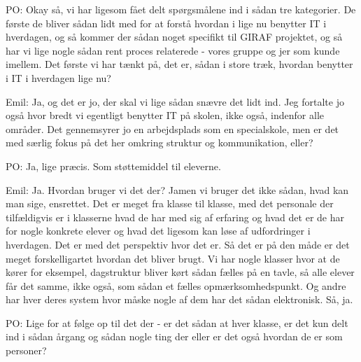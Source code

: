 PO:
Okay så, vi har ligesom fået delt spørgsmålene ind i sådan tre kategorier. 
De første de bliver sådan lidt med for at forstå hvordan i lige nu benytter IT i hverdagen, og så kommer der sådan noget specifikt til GIRAF projektet, og så har vi lige nogle sådan rent proces relaterede - vores gruppe og jer som kunde imellem.
Det første vi har tænkt på, det er, sådan i store træk, hvordan benytter i IT i hverdagen lige nu?   

Emil: 
Ja, og det er jo, der skal vi lige sådan snævre det lidt ind. 
Jeg fortalte jo også hvor bredt vi egentligt benytter IT på skolen, ikke også, indenfor alle områder. 
Det gennemsyrer jo en arbejdsplads som en specialskole, men er det med særlig fokus på det her omkring struktur og kommunikation, eller?

PO: 
Ja, lige præcis.
Som støttemiddel til eleverne.

Emil:
Ja.
Hvordan bruger vi det der?
Jamen vi bruger det ikke sådan, hvad kan man sige, ensrettet.
Det er meget fra klasse til klasse, med det personale der tilfældigvis er i klasserne hvad de har med sig af erfaring og hvad det er de har for nogle konkrete elever og hvad det ligesom kan løse af udfordringer i hverdagen.
Det er med det perspektiv hvor det er.
Så det er på den måde er det meget forskelligartet hvordan det bliver brugt.
Vi har nogle klasser hvor at de kører for eksempel, dagstruktur bliver kørt sådan fælles på en tavle, så alle elever får det samme, ikke også, som sådan et fælles opmærksomhedspunkt.
Og andre har hver deres system hvor måske nogle af dem har det sådan elektronisk. 
Så, ja.

PO:
Lige for at følge op til det der - er det sådan at hver klasse, er det kun delt ind i sådan årgang og sådan nogle ting der eller er det også hvordan de er som personer?

